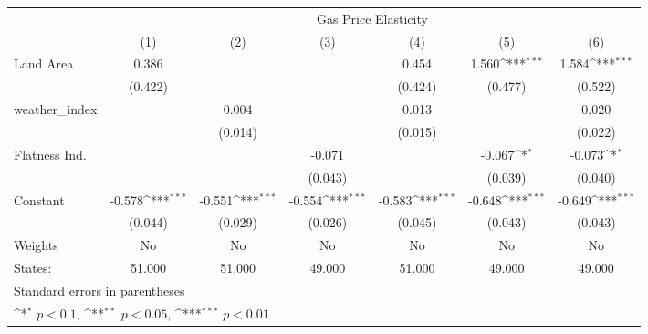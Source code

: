 {
\def\sym#1{\ifmmode^{#1}\else\(^{#1}\)\fi}
\begin{tabular}{l*{6}{c}}
\hline\hline
            &\multicolumn{6}{c}{Gas Price Elasticity}                                                                                           \\
            &\multicolumn{1}{c}{(1)}         &\multicolumn{1}{c}{(2)}         &\multicolumn{1}{c}{(3)}         &\multicolumn{1}{c}{(4)}         &\multicolumn{1}{c}{(5)}         &\multicolumn{1}{c}{(6)}         \\
\hline
Land Area   &       0.386         &                     &                     &       0.454         &       1.560\sym{***}&       1.584\sym{***}\\
            &     (0.422)         &                     &                     &     (0.424)         &     (0.477)         &     (0.522)         \\
[1em]
weather\_index&                     &       0.004         &                     &       0.013         &                     &       0.020         \\
            &                     &     (0.014)         &                     &     (0.015)         &                     &     (0.022)         \\
[1em]
Flatness Ind.&                     &                     &      -0.071         &                     &      -0.067\sym{*}  &      -0.073\sym{*}  \\
            &                     &                     &     (0.043)         &                     &     (0.039)         &     (0.040)         \\
[1em]
Constant    &      -0.578\sym{***}&      -0.551\sym{***}&      -0.554\sym{***}&      -0.583\sym{***}&      -0.648\sym{***}&      -0.649\sym{***}\\
            &     (0.044)         &     (0.029)         &     (0.026)         &     (0.045)         &     (0.043)         &     (0.043)         \\
\hline
Weights     &          No         &          No         &          No         &          No         &          No         &          No         \\
States:     &      51.000         &      51.000         &      49.000         &      51.000         &      49.000         &      49.000         \\
\hline\hline
\multicolumn{7}{l}{\footnotesize Standard errors in parentheses}\\
\multicolumn{7}{l}{\footnotesize \sym{*} \(p<0.1\), \sym{**} \(p<0.05\), \sym{***} \(p<0.01\)}\\
\end{tabular}
}
